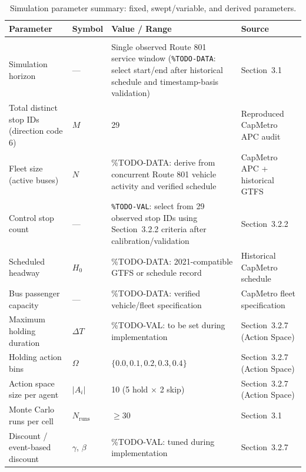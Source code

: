 \begin{table}[htbp]
\centering
\caption{Simulation parameter summary: fixed, swept/variable, and derived parameters.}
\label{tab:sim-parameters}
\small
\renewcommand{\arraystretch}{1.25}

\begin{tabularx}{\textwidth}{
>{\RaggedRight\arraybackslash}p{}
>{\RaggedRight\arraybackslash}p{}
X
>{\RaggedRight\arraybackslash}p{}
}

\toprule
\textbf{Parameter} & \textbf{Symbol} & \textbf{Value / Range} & \textbf{Source} \\
\midrule
\multicolumn{4}{l}{\textit{Fixed simulation parameters}} \\
\midrule

Simulation horizon & --- & Single observed Route 801 service window (\texttt{\%TODO-DATA}: select start/end after historical schedule and timestamp-basis validation) & Section~3.1 \\
Total distinct stop IDs (direction code 6) & $M$ & 29 & Reproduced CapMetro APC audit \\
Fleet size (active buses) & $N$ & \%TODO-DATA: derive from concurrent Route 801 vehicle activity and verified schedule & CapMetro APC + historical GTFS \\
Control stop count & --- & \texttt{\%TODO-VAL}: select from 29 observed stop IDs using Section~3.2.2 criteria after calibration/validation & Section~3.2.2 \\
Scheduled headway & $H_0$ & \%TODO-DATA: 2021-compatible GTFS or schedule record & Historical CapMetro schedule \\
Bus passenger capacity & --- & \%TODO-DATA: verified vehicle/fleet specification & CapMetro fleet specification \\
Maximum holding duration & $\Delta T$ & \%TODO-VAL: to be set during implementation & Section~3.2.7 (Action Space) \\
Holding action bins & $\Omega$ & $\{0.0, 0.1, 0.2, 0.3, 0.4\}$ & Section~3.2.7 (Action Space) \\
Action space size per agent & $|A_i|$ & 10 (5 hold $\times$ 2 skip) & Section~3.2.7 (Action Space) \\
Monte Carlo runs per cell & $N_{\text{runs}}$ & $\geq 30$ & Section~3.1 \\
Discount / event-based discount & $\gamma$, $\beta$ & \%TODO-VAL: tuned during implementation & Section~3.2.7 \\


\end{tabularx}
\end{table}
